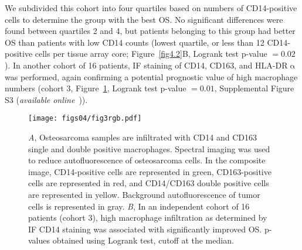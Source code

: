 We subdivided this cohort into four quartiles based on
numbers of CD14\hyp{}positive cells to determine the group
with the best OS. No significant differences were found
between quartiles 2 and 4, but patients belonging to this
group had better OS than patients with low CD14 counts
(lowest quartile, or less than 12 CD14\hyp{}positive cells per
tissue array core; Figure~\ref{fig4.2}B, Logrank test p-value $=0.02$). In another
cohort of 16 patients, IF staining of CD14, CD163, and
HLA-DR$\upalpha$ was performed, again confirming a potential
prognostic value of high macrophage numbers (cohort 3,
Figure~\ref{fig4.3}, Logrank test p-value $=0.01$, Supplemental Figure S3 ({\it available online}~\cite{ch4additional})).
%
\begin{figure}[htbp]
	\centering
	\texttt{[image: figs04/fig3rgb.pdf]}	%
	\caption{{\it A}, Osteosarcoma samples are infiltrated with CD14 and CD163 single and double positive macrophages. Spectral imaging was used to reduce autofluorescence of osteosarcoma cells. In the composite image, CD14\hyp{}positive cells are represented in green, CD163\hyp{}positive cells are represented in red, and CD14/CD163 double positive cells are represented in yellow. Background autofluorescence of tumor cells is represented in gray. {\it B}, In an independent cohort of 16 patients (cohort 3), high macrophage infiltration as determined by IF CD14 staining was associated with significantly improved OS. p-values obtained using Logrank test, cutoff at the median.}
	\label{fig4.3}
\end{figure}
%

